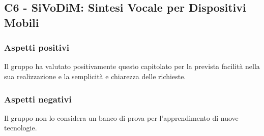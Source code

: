 \subsection{C6 - SiVoDiM: Sintesi Vocale per Dispositivi Mobili}
\subsubsection{Aspetti positivi}
Il gruppo ha valutato positivamente questo capitolato per la prevista facilità nella sua realizzazione e 
la semplicità e chiarezza delle richieste.
\subsubsection{Aspetti negativi}
Il gruppo non lo considera un banco di prova per l'apprendimento di nuove tecnologie.

